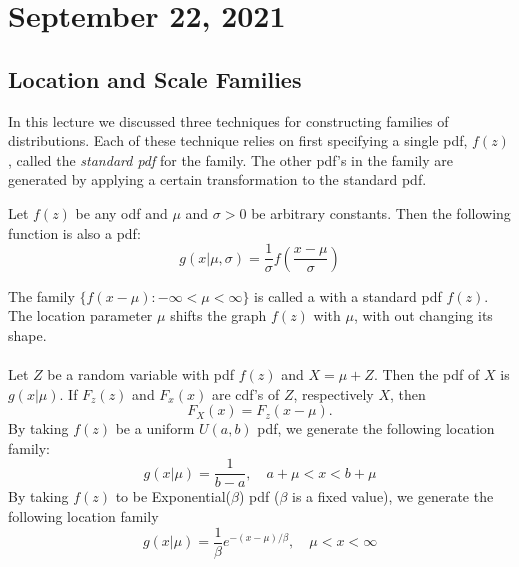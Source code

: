 \section{September 22, 2021}
\subsection{Location and Scale Families}
In this lecture we discussed three techniques for constructing families of distributions. Each of these technique relies on first specifying a single pdf,
$f(z)$, called the \textit{standard pdf} for the family. The other pdf's in the family are generated by applying a certain transformation to the standard pdf. 

\begin{theorem}
    Let $f(z)$ be any odf and $\mu$ and $\sigma >0$ be arbitrary constants. Then the following function is also a pdf:
    $$
    g(x|\mu, \sigma) = \frac{1}{\sigma}f \left ( 
    \frac{x-\mu}{\sigma}
    \right )
    $$
\end{theorem}
The family $\{ f(x-\mu): - \infty < \mu < \infty \}$ is called a  with a standard pdf $f(z)$. The location parameter $\mu$ shifts the graph $f(z)$ with $\mu$, with out changing its shape.\\
\\
 Let $Z$ be a random variable with pdf $f(z)$ and $X = \mu + Z$. Then the pdf of $X$ is $g(x|\mu)$. If $F_z(z)$ and $F_x(x)$ are cdf's of $Z$, respectively $X$, then
$$
F_X(x) = F_z(x-\mu).
$$
 By taking $f(z)$ be a uniform $U(a,b)$ pdf, we generate the following location family:
$$
g(x|\mu) = \frac{1}{b-a}, \quad a+\mu < x < b + \mu
$$
 By taking $f(z)$ to be Exponential($\beta$) pdf ($\beta$ is a fixed value), we generate the following location family
$$
g(x|\mu) = \frac{1}{\beta}e^{-(x-\mu)/\beta}, \quad \mu <x< \infty
$$

